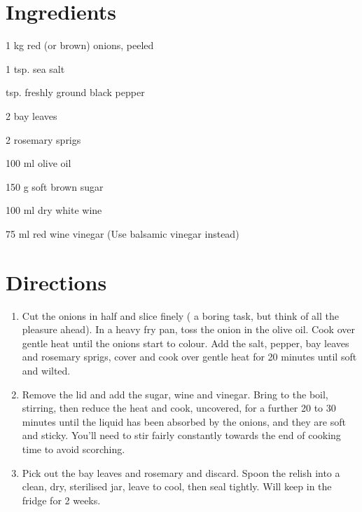 \section*{Ingredients}
\begin{ingredients-list}
\item 1 kg red (or brown) onions, peeled
\item 1 tsp. sea salt
\item {} tsp. freshly ground black pepper
\item 2 bay leaves
\item 2 rosemary sprigs
\item 100 ml olive oil
\item 150 g soft brown sugar
\item 100 ml dry white wine
\item 75 ml red wine vinegar (Use balsamic vinegar instead)
\end{ingredients-list}

\section*{Directions}
\begin{enumerate}
\item Cut the onions in half and slice finely ( a boring task, but think of all the pleasure ahead).
	In a heavy fry pan, toss the onion in the olive oil. Cook over gentle heat until the onions start to colour.
	Add the salt, pepper, bay leaves and rosemary sprigs, cover and cook over gentle heat for 20 minutes until soft and wilted.
\item Remove the lid and add the sugar, wine and vinegar.
	Bring to the boil, stirring, then reduce the heat and cook, uncovered, for a further 20 to 30 minutes until the liquid has been absorbed by the onions, and they are soft and sticky.
	You'll need to stir fairly constantly towards the end of cooking time to avoid scorching.
\item Pick out the bay leaves and rosemary and discard. Spoon the relish into a clean, dry, sterilised jar, leave to cool, then seal tightly. Will keep in the fridge for 2 weeks.
\end{enumerate}
